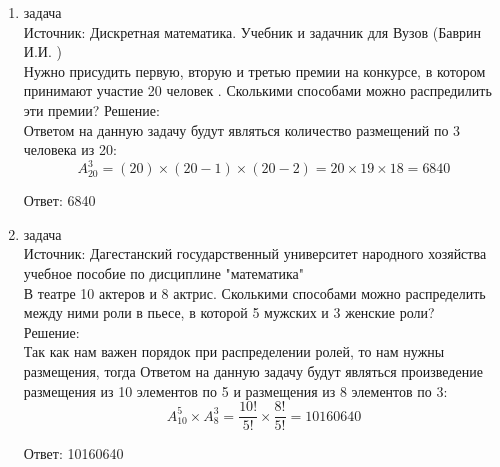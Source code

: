 \documentclass[a4paper,14pt]{extreport} %
\begin{document}
\begin{center}
\begin{enumerate}
						
						
						
						
						
						
						
						
						
						
						\item {\large задача  }\\
						Источник: Дискретная математика. Учебник и задачник для Вузов (Баврин И.И. )\\
						\vspace{15pt}
						Нужно присудить первую, вторую и третью премии на конкурсе, в котором принимают  участие 20 человек . Сколькими способами можно распредилить эти премии?
						\vspace{15pt}
						Решение:\\
						Ответом на данную задачу будут являться количество размещений по 3 человека из 20:
						\begin{equation}
							A_{20}^3 = (20)\times(20-1)\times(20-2) = 20\times 19 \times 18 = 6840
						\end{equation}
						
						Ответ: 6840
						
						
						 
						 \item {\large задача }\\
						 Источник: Дагестанский государственный университет народного хозяйства учебное пособие по дисциплине "математика"  \\
						\vspace{15pt}
						 В театре 10 актеров и 8 актрис. Сколькими способами можно
						 распределить между ними роли в пьесе, в которой 5 мужских и 3
						 женские роли?\\
						 \vspace{15pt}
						 \newpage
						 Решение:\\
						 Так как нам важен порядок при распределении ролей, то нам нужны размещения, тогда 
						 Ответом на данную задачу будут являться произведение размещения из 10 элементов по 5 и размещения из 8 элементов по 3:
						 \begin{equation}
						 	A_{10}^5\times A_{8}^3 = \frac{10!}{5!}\times\frac{8!}{5!}= 10160640
						 \end{equation}
						 
						 Ответ: 10160640
						 

\end{enumerate}
\end{center}
\end{document}
